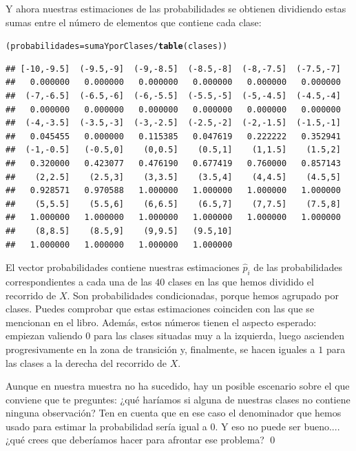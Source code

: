 \documentclass[10pt,a4paper]{article}\usepackage[]{graphicx}\usepackage[]{color}
\makeatletter
\newcommand{\hlopt}[1]{\textcolor[rgb]{0,0,0}{#1}}%
\newcommand{\hlstd}[1]{\textcolor[rgb]{0.345,0.345,0.345}{#1}}%
\newcommand{\hlkwb}[1]{\textcolor[rgb]{0.69,0.353,0.396}{#1}}%
\newcommand{\hlkwd}[1]{\textcolor[rgb]{0.737,0.353,0.396}{\textbf{#1}}}%
\newenvironment{kframe}{%
 \def\at@end@of@kframe{}%
 \ifinner\ifhmode%
  \def\at@end@of@kframe{\end{minipage}}%
  \begin{minipage}{\columnwidth}%
 \fi\fi%
 \def\FrameCommand##1{\hskip\@totalleftmargin \hskip-\fboxsep
 \colorbox{shadecolor}{##1}\hskip-\fboxsep
     \hskip-\linewidth \hskip-\@totalleftmargin \hskip\columnwidth}%
 \MakeFramed {\advance\hsize-\width
   \@totalleftmargin\z@ \linewidth\hsize
   \@setminipage}}%
 {\par\unskip\endMakeFramed%
 \at@end@of@kframe}
\newenvironment{knitrout}{}{} %
\newcounter {cont01}
\makeatother
\begin{document}
\begin{enumerate}
Y ahora nuestras estimaciones de las probabilidades se obtienen dividiendo estas sumas entre el número de elementos que contiene cada clase:
\begin{knitrout}
\color{fgcolor}\begin{kframe}
\begin{alltt}
\hlstd{(probabilidades} \hlkwb{=} \hlstd{sumaYporClases} \hlopt{/} \hlkwd{table}\hlstd{(clases))}
\end{alltt}
\begin{verbatim}
## [-10,-9.5]  (-9.5,-9]  (-9,-8.5]  (-8.5,-8]  (-8,-7.5]  (-7.5,-7] 
##   0.000000   0.000000   0.000000   0.000000   0.000000   0.000000 
##  (-7,-6.5]  (-6.5,-6]  (-6,-5.5]  (-5.5,-5]  (-5,-4.5]  (-4.5,-4] 
##   0.000000   0.000000   0.000000   0.000000   0.000000   0.000000 
##  (-4,-3.5]  (-3.5,-3]  (-3,-2.5]  (-2.5,-2]  (-2,-1.5]  (-1.5,-1] 
##   0.045455   0.000000   0.115385   0.047619   0.222222   0.352941 
##  (-1,-0.5]   (-0.5,0]    (0,0.5]    (0.5,1]    (1,1.5]    (1.5,2] 
##   0.320000   0.423077   0.476190   0.677419   0.760000   0.857143 
##    (2,2.5]    (2.5,3]    (3,3.5]    (3.5,4]    (4,4.5]    (4.5,5] 
##   0.928571   0.970588   1.000000   1.000000   1.000000   1.000000 
##    (5,5.5]    (5.5,6]    (6,6.5]    (6.5,7]    (7,7.5]    (7.5,8] 
##   1.000000   1.000000   1.000000   1.000000   1.000000   1.000000 
##    (8,8.5]    (8.5,9]    (9,9.5]   (9.5,10] 
##   1.000000   1.000000   1.000000   1.000000
\end{verbatim}
\end{kframe}
\end{knitrout}
El vector probabilidades contiene nuestras estimaciones $\hat p_i$ de las probabilidades correspondientes a cada una de las $40$ clases en las que hemos dividido el recorrido de $X$. Son probabilidades condicionadas, porque hemos agrupado por clases. Puedes comprobar que estas estimaciones coinciden con las que se mencionan en el libro. Además, estos números tienen el aspecto esperado: empiezan valiendo $0$ para las clases situadas muy a la izquierda, luego ascienden progresivamente en la zona de transición y, finalmente, se hacen iguales a $1$ para las clases a la derecha del recorrido de $X$.

\begin{ejercicio}
\label{tut13:ejercicio02}
Aunque en nuestra muestra no ha sucedido, hay un posible escenario sobre el que conviene que te preguntes: ¿qué haríamos si alguna de nuestras clases no contiene ninguna observación? Ten en cuenta que en ese caso el denominador que hemos usado para estimar la probabilidad sería igual a $0$.  Y eso no puede ser bueno.... ¿qué crees que deberíamos hacer para afrontar ese problema?
\qed
\end{ejercicio}



\end{enumerate}
\end{document}
